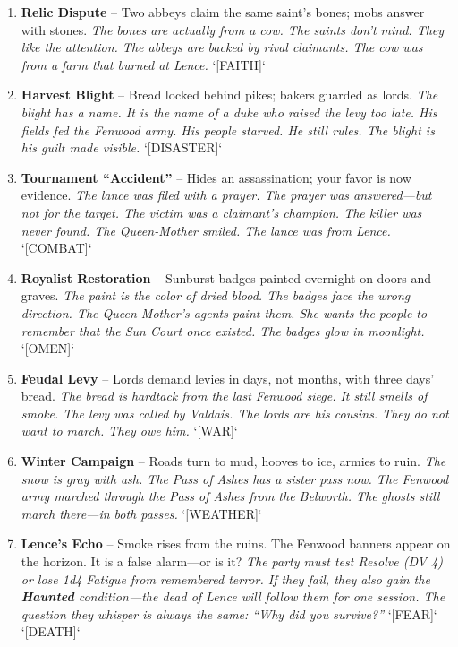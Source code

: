 \begin{enumerate}
\item \textbf{Relic Dispute} -- Two abbeys claim the same saint's bones; mobs answer with stones.
  \hfill \textit{The bones are actually from a cow. The saints don't mind. They like the attention. The abbeys are backed by rival claimants. The cow was from a farm that burned at Lence.} `[FAITH]`
\item \textbf{Harvest Blight} -- Bread locked behind pikes; bakers guarded as lords.
  \hfill \textit{The blight has a name. It is the name of a duke who raised the levy too late. His fields fed the Fenwood army. His people starved. He still rules. The blight is his guilt made visible.} `[DISASTER]`
\item \textbf{Tournament ``Accident''} -- Hides an assassination; your favor is now evidence.
  \hfill \textit{The lance was filed with a prayer. The prayer was answered---but not for the target. The victim was a claimant's champion. The killer was never found. The Queen-Mother smiled. The lance was from Lence.} `[COMBAT]`
\item[J] \textbf{Royalist Restoration} -- Sunburst badges painted overnight on doors and graves.
  \hfill \textit{The paint is the color of dried blood. The badges face the wrong direction. The Queen-Mother's agents paint them. She wants the people to remember that the Sun Court once existed. The badges glow in moonlight.} `[OMEN]`
\item[Q] \textbf{Feudal Levy} -- Lords demand levies in days, not months, with three days' bread.
  \hfill \textit{The bread is hardtack from the last Fenwood siege. It still smells of smoke. The levy was called by Valdais. The lords are his cousins. They do not want to march. They owe him.} `[WAR]`
\item[K] \textbf{Winter Campaign} -- Roads turn to mud, hooves to ice, armies to ruin.
  \hfill \textit{The snow is gray with ash. The Pass of Ashes has a sister pass now. The Fenwood army marched through the Pass of Ashes from the Belworth. The ghosts still march there---in both passes.} `[WEATHER]`
\item[A] \textbf{Lence's Echo} -- Smoke rises from the ruins. The Fenwood banners appear on the horizon. It is a false alarm---or is it?
  \hfill \textit{The party must test Resolve (DV 4) or lose 1d4 Fatigue from remembered terror. If they fail, they also gain the \textbf{Haunted} condition---the dead of Lence will follow them for one session. The question they whisper is always the same: ``Why did you survive?''} `[FEAR]` `[DEATH]`
\end{enumerate}

